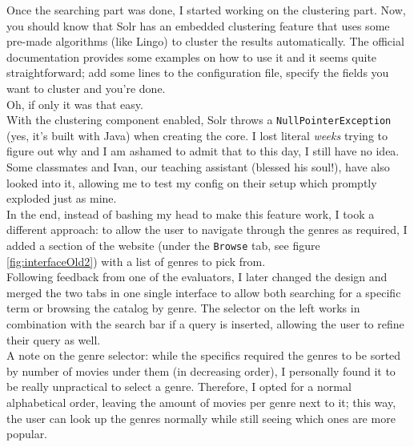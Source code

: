 \documentclass[12pt]{article}
\begin{document}
	Once the searching part was done, I started working on the clustering part. Now, you should know that Solr has an embedded clustering feature that uses some pre-made algorithms (like Lingo) to cluster the results automatically. The official documentation provides some examples on how to use it and it seems quite straightforward; add some lines to the configuration file, specify the fields you want to cluster and you're done.\\
	
	Oh, if only it was that easy.\\
	
	With the clustering component enabled, Solr throws a \texttt{NullPointerException} (yes, it's built with Java) when creating the core. I lost literal \textit{weeks} trying to figure out why and I am ashamed to admit that to this day, I still have no idea. Some classmates and Ivan, our teaching assistant (blessed his soul!), have also looked into it, allowing me to test my config on their setup which promptly exploded just as mine.\\
	
	In the end, instead of bashing my head to make this feature work, I took a different approach: to allow the user to navigate through the genres as required, I added a section of the website (under the \texttt{Browse} tab, see figure \ref{fig:interfaceOld2}) with a list of genres to pick from.\\
	
	Following feedback from one of the evaluators, I later changed the design and merged the two tabs in one single interface to allow both searching for a specific term or browsing the catalog by genre. The selector on the left works in combination with the search bar if a query is inserted, allowing the user to refine their query as well.\\
	
	A note on the genre selector: while the specifics required the genres to be sorted by number of movies under them (in decreasing order), I personally found it to be really unpractical to select a genre.
	Therefore, I opted for a normal alphabetical order, leaving the amount of movies per genre next to it; this way, the user can look up the genres normally while still seeing which ones are more popular.
	
	\newpage
		
\end{document}
